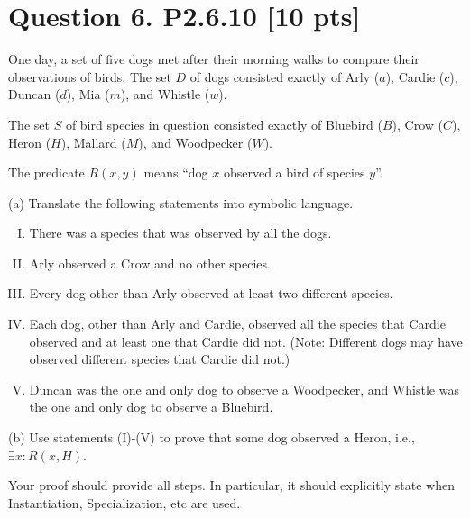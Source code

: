 \documentclass[12pt]{article}
\begin{document}
	\section*{\textbf{Question 6. P2.6.10} [10 pts]}
	One day, a set of five dogs met after their morning walks to compare their observations
	of birds. The set $D$ of dogs consisted exactly of Arly ($a$), Cardie ($c$),
	Duncan ($d$), Mia ($m$), and Whistle ($w$).

	The set $S$ of bird species in question consisted exactly of Bluebird ($B$), Crow
	($C$), Heron ($H$), Mallard ($M$), and Woodpecker ($W$).

	The predicate $R(x, y)$ means “dog $x$ observed a bird of species $y$”.

	(a) Translate the following statements into symbolic language.
	\begin{enumerate}[I.]
		\item There was a species that was observed by all the dogs.

		\item Arly observed a Crow and no other species.

		\item Every dog other than Arly observed at least two different species.

		\item Each dog, other than Arly and Cardie, observed all the species that Cardie
			observed and at least one that Cardie did not. (Note: Different dogs may
			have observed different species that Cardie did not.)

		\item Duncan was the one and only dog to observe a Woodpecker, and Whistle
			was the one and only dog to observe a Bluebird.
	\end{enumerate}
	(b) Use statements (I)-(V) to prove that some dog observed a Heron, i.e., $\exists
	x: R(x,H).$

	Your proof should provide all steps. In particular, it should explicitly state
	when Instantiation, Specialization, etc are used.
\end{document}
